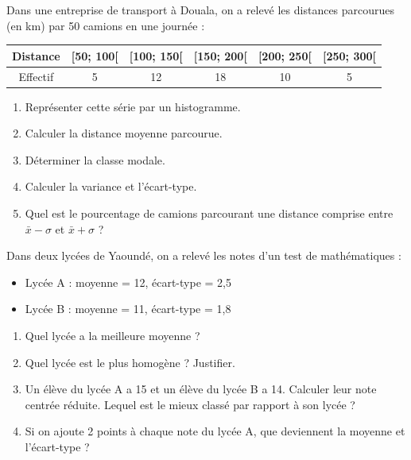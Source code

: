 Dans une entreprise de transport à Douala, on a relevé les distances parcourues (en km) par 50 camions en une journée :
\begin{center}
\begin{tabular}{|c|c|c|c|c|c|}
\hline
Distance & [50; 100[ & [100; 150[ & [150; 200[ & [200; 250[ & [250; 300[ \\
\hline
Effectif & 5 & 12 & 18 & 10 & 5 \\
\hline
\end{tabular}
\end{center}
\begin{enumerate}[label=\arabic*)]
\item Représenter cette série par un histogramme.
\item Calculer la distance moyenne parcourue.
\item Déterminer la classe modale.
\item Calculer la variance et l'écart-type.
\item Quel est le pourcentage de camions parcourant une distance comprise entre \(\bar{x} - \sigma\) et \(\bar{x} + \sigma\) ?
\end{enumerate}

Dans deux lycées de Yaoundé, on a relevé les notes d'un test de mathématiques :
\begin{itemize}
\item Lycée A : moyenne = 12, écart-type = 2,5
\item Lycée B : moyenne = 11, écart-type = 1,8
\end{itemize}
\begin{enumerate}[label=\arabic*)]
\item Quel lycée a la meilleure moyenne ?
\item Quel lycée est le plus homogène ? Justifier.
\item Un élève du lycée A a 15 et un élève du lycée B a 14. Calculer leur note centrée réduite. Lequel est le mieux classé par rapport à son lycée ?
\item Si on ajoute 2 points à chaque note du lycée A, que deviennent la moyenne et l'écart-type ?
\end{enumerate}


